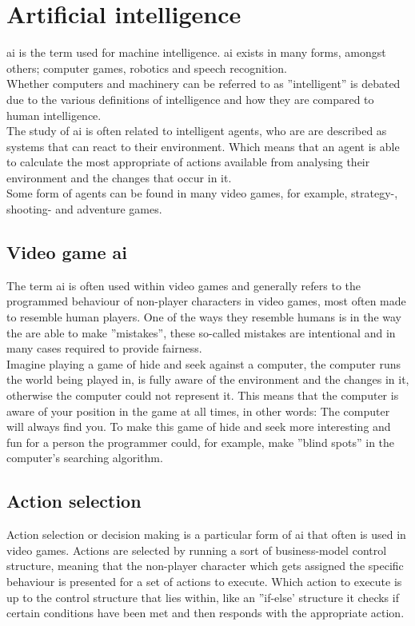 \section{Artificial intelligence}
\ac{ai} is the term used for machine intelligence. \ac{ai} exists in many forms, amongst others; computer games, robotics and speech recognition.\\
Whether computers and machinery can be referred to as ''intelligent'' is debated due to the various definitions of intelligence and how they are compared to human intelligence.\\
The study of \ac{ai} is often related to intelligent agents, who are are described as systems that can react to their environment. Which means that an agent is able to calculate the most appropriate of actions available from analysing their environment and the changes that occur in it.\\
Some form of agents can be found in many video games, for example, strategy-, shooting- and adventure games.\cite{artint}

\subsection{Video game \ac{ai}}
The term \ac{ai} is often used within video games and generally refers to the programmed behaviour of non-player characters in video games, most often made to resemble human players. One of the ways they resemble humans is in the way the are able to make ''mistakes'', these so-called mistakes are intentional and in many cases required to provide fairness.\\
Imagine playing a game of hide and seek against a computer, the computer runs the world being played in, is fully aware of the environment and the changes in it, otherwise the computer could not represent it. This means that the computer is aware of your position in the game at all times, in other words: The computer will always find you. To make this game of hide and seek more interesting and fun for a person the programmer could, for example, make ''blind spots'' in the computer's searching algorithm.\cite{videoint}

\subsection{Action selection}
Action selection or decision making is a particular form of \ac{ai} that often is used in video games. Actions are selected by running a sort of business-model control structure, meaning that the non-player character which gets assigned the specific behaviour is presented for a set of actions to execute. Which action to execute is up to the control structure that lies within, like an ''if-else' structure it checks if certain conditions have been met and then responds with the appropriate action.\cite{actionselect}
